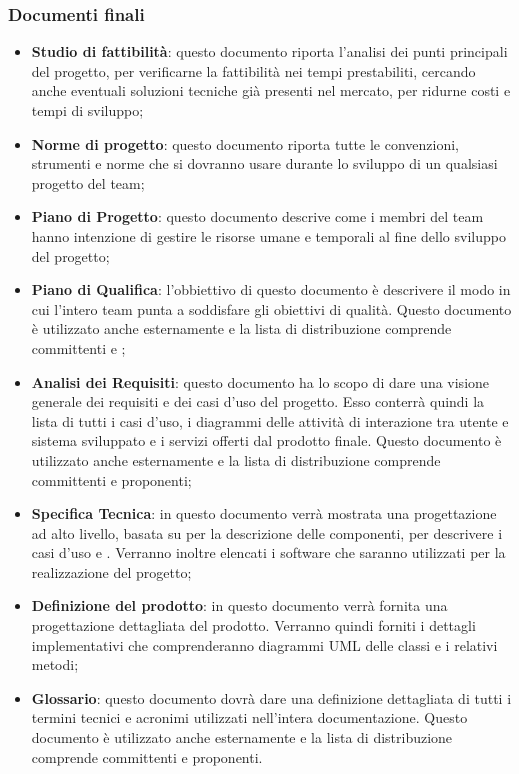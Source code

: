 \documentclass[../NormeDiProgetto.tex]{subfiles}
\begin{document}
\subsubsection{Documenti finali}
\begin{itemize}
\item \textbf{Studio di fattibilità}: questo documento riporta l'analisi dei punti principali del progetto, per verificarne la fattibilità nei tempi prestabiliti, cercando anche eventuali soluzioni tecniche già presenti nel mercato, per ridurne costi e tempi di sviluppo;
\item \textbf{Norme di progetto}: questo documento riporta tutte le convenzioni, strumenti e norme che si dovranno usare durante lo sviluppo di un qualsiasi progetto del team;
\item \textbf{Piano di Progetto}: questo documento descrive come i membri del team hanno intenzione di gestire le risorse umane e temporali al fine dello sviluppo del progetto;
\item \textbf{Piano di Qualifica}: l'obbiettivo di questo documento è descrivere il modo in cui l'intero team punta a soddisfare gli obiettivi di qualità. Questo documento è utilizzato anche esternamente e la lista di distribuzione
comprende committenti e ;
\item \textbf{Analisi dei Requisiti}: questo documento ha lo scopo di dare una visione generale dei requisiti e dei casi d'uso del progetto.
Esso conterrà quindi la lista di tutti i casi d'uso, i diagrammi delle attività di interazione tra utente e sistema sviluppato e i servizi offerti dal prodotto finale. Questo documento è utilizzato anche esternamente e la lista di distribuzione comprende committenti e proponenti;
\item \textbf{Specifica Tecnica}: in questo documento verrà mostrata una progettazione ad alto livello, basata su  per la descrizione delle componenti,  per descrivere i casi d'uso e . Verranno inoltre elencati i software che saranno utilizzati per la realizzazione del progetto;
\item \textbf{Definizione del prodotto}: in questo documento verrà fornita una progettazione dettagliata del prodotto. Verranno quindi forniti i dettagli implementativi che comprenderanno diagrammi UML delle classi e i relativi metodi;
\item \textbf{Glossario}: questo documento dovrà dare una definizione dettagliata di tutti i termini tecnici e acronimi utilizzati nell'intera documentazione. Questo documento è utilizzato anche esternamente e la lista di distribuzione comprende committenti e proponenti.

\end{itemize}
\end{document}
